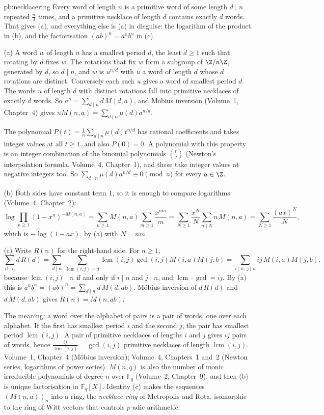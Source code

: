 \begin{solution}{pb:necklacering}
\idea Every word of length $n$ is a primitive word of some length $d\mid n$ repeated $\frac nd$ times, and a primitive necklace
of length $d$ contains exactly $d$ words. That gives (a), and everything else is (a) in disguise: the logarithm of the product
in (b), and the factorisation $(ab)^n=a^nb^n$ in (c).

\writeup (a) A word $w$ of length $n$ has a smallest period $d$, the least $d\ge1$ such that rotating by $d$ fixes $w$. The
rotations that fix $w$ form a subgroup of $\Z/n\Z$, generated by $d$, so $d\mid n$, and $w$ is $u^{n/d}$ with $u$ a word of length
$d$ whose $d$ rotations are distinct. Conversely each such $u$ gives a word of smallest period $d$. The words $u$ of length $d$
with distinct rotations fall into primitive necklaces of exactly $d$ words. So $a^n=\sum_{d\mid n}d\,M(d,a)$, and Möbius
inversion (Volume~1, Chapter~4) gives $nM(n,a)=\sum_{d\mid n}\mu(d)a^{n/d}$.

The polynomial $P(t)=\frac1n\sum_{d\mid n}\mu(d)t^{n/d}$ has rational coefficients and takes integer values at all $t\ge1$, and also $P(0)=0$.
A polynomial with this property is an integer combination of the binomial polynomials $\binom tj$ (Newton's interpolation
formula, Volume~4, Chapter~1), and these take integer values at negative integers too. So $\sum_{d\mid n}\mu(d)a^{n/d}\equiv0\pmod n$
for every $a\in\Z$.

(b) Both sides have constant term $1$, so it is enough to compare logarithms (Volume~4, Chapter~2):
\[
\log\prod_{n\ge1}(1-x^n)^{-M(n,a)}=\sum_{n\ge1}M(n,a)\sum_{m\ge1}\frac{x^{nm}}m=\sum_{N\ge1}\frac{x^N}N\sum_{n\mid N}n\,M(n,a)
=\sum_{N\ge1}\frac{(ax)^N}N,
\]
which is $-\log(1-ax)$, by (a) with $N=nm$.

(c) Write $R(n)$ for the right-hand side. For $n\ge1$,
\[
\sum_{d\mid n}d\,R(d)=\sum_{d\mid n}\ \sum_{\operatorname{lcm}(i,j)=d}\operatorname{lcm}(i,j)\gcd(i,j)M(i,a)M(j,b)=\sum_{i\mid n,\ j\mid n}ij\,M(i,a)M(j,b),
\]
because $\operatorname{lcm}(i,j)\mid n$ if and only if $i\mid n$ and $j\mid n$, and $\operatorname{lcm}\cdot\gcd=ij$. By (a) this is
$a^nb^n=(ab)^n=\sum_{d\mid n}d\,M(d,ab)$. Möbius inversion of $d\,R(d)$ and $d\,M(d,ab)$ gives $R(n)=M(n,ab)$.

The meaning: a word over the alphabet of pairs is a pair of words, one over each alphabet. If the first has smallest period $i$
and the second $j$, the pair has smallest period $\operatorname{lcm}(i,j)$. A pair of primitive necklaces of lengths $i$ and $j$
gives $ij$ pairs of words, hence $\frac{ij}{\operatorname{lcm}(i,j)}=\gcd(i,j)$ primitive necklaces of length $\operatorname{lcm}(i,j)$.
\tools Volume~1, Chapter~4 (Möbius inversion); Volume~4, Chapters~1 and~2 (Newton series, logarithms of power series).
\leads $M(n,q)$ is also the number of monic irreducible polynomials of degree $n$ over $\mathbb F_q$ (Volume~2, Chapter~9), and then
(b) is unique factorisation in $\mathbb F_q[X]$. Identity (c) makes the sequences $(M(n,a))_n$ into a ring, the \emph{necklace
ring} of Metropolis and Rota, isomorphic to the ring of Witt vectors that controls $p$-adic arithmetic.
\end{solution}

